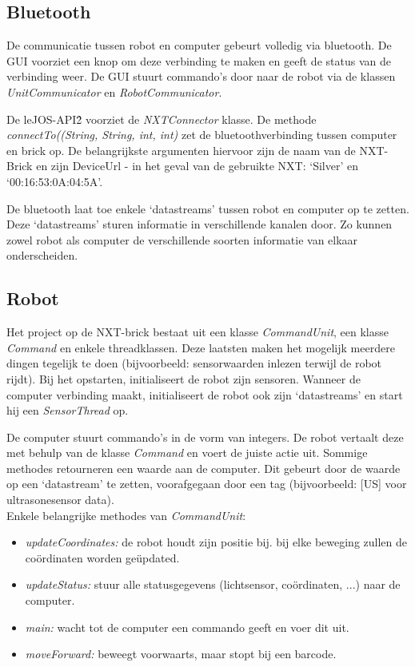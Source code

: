 \documentclass[tt3]{penoverslag}
\begin{document}
\subsection{Bluetooth} %
\label{ssec:bluetooth}
De communicatie tussen robot en computer gebeurt volledig via bluetooth. De GUI voorziet een knop om deze verbinding te maken en geeft de status van de verbinding weer. De GUI stuurt commando's door naar de robot via de klassen \textit{UnitCommunicator} en \textit{RobotCommunicator}.

De leJOS-API\^{2} voorziet de \textit{NXTConnector} klasse. De methode \textit{connectTo((String, String, int, int)} zet de bluetoothverbinding tussen computer en brick op. De belangrijkste argumenten hiervoor zijn de naam van de NXT-Brick en zijn DeviceUrl  - in het geval van de gebruikte NXT: `Silver' en `00:16:53:0A:04:5A'.

De bluetooth laat toe enkele `datastreams' tussen robot en computer op te zetten. Deze `datastreams' sturen informatie in verschillende kanalen door. Zo kunnen zowel robot als computer de verschillende soorten informatie van elkaar onderscheiden.

\subsection{Robot} %
\label{ssec:robot}
Het project op de NXT-brick bestaat uit een klasse \textit{CommandUnit}, een klasse \textit{Command} en enkele threadklassen. Deze laatsten maken het mogelijk meerdere dingen tegelijk te doen (bijvoorbeeld: sensorwaarden inlezen terwijl de robot rijdt). Bij het opstarten, initialiseert de robot zijn sensoren. Wanneer de computer verbinding maakt, initialiseert de robot ook zijn `datastreams' en start hij een \textit{SensorThread} op.

De computer stuurt commando's in de vorm van integers. De robot vertaalt deze met behulp van de klasse \textit{Command} en voert de juiste actie uit. Sommige methodes retourneren een waarde aan de computer. Dit gebeurt door de waarde op een `datastream' te zetten, voorafgegaan door een tag (bijvoorbeeld: [US] voor ultrasonesensor data).\\

Enkele belangrijke methodes van \textit{CommandUnit}:
\begin{itemize}
\item \textit{updateCoordinates:} de robot houdt zijn positie bij. bij elke beweging zullen de co\"ordinaten worden ge\"updated.
\item \textit{updateStatus:} stuur alle statusgegevens (lichtsensor, co\"ordinaten, ...) naar de computer.
\item \textit{main:} wacht tot de computer een commando geeft en voer dit uit.
\item \textit{moveForward:} beweegt voorwaarts, maar stopt bij een barcode.
\end{itemize}
\end{document}
